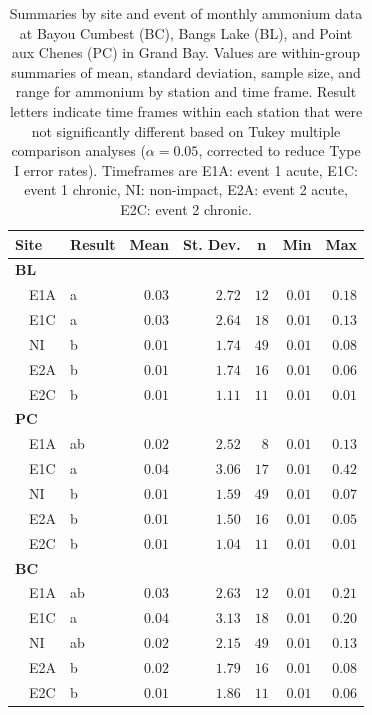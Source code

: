 \documentclass[letterpaper,12pt]{article}\usepackage[]{graphicx}\usepackage[]{color}
\begin{document}
\begin{table}[!tbp]
\caption{Summaries by site and event of monthly ammonium data at Bayou Cumbest (BC), Bangs Lake (BL), and Point aux Chenes (PC) in Grand Bay.  Values are within-group summaries of mean, standard deviation, sample size, and range for ammonium by station and time frame.  Result letters indicate time frames within each station that were not significantly different based on Tukey multiple comparison analyses ($\alpha = 0.05$, corrected to reduce Type I error rates). Timeframes are E1A: event 1 acute, E1C: event 1 chronic, NI: non-impact, E2A: event 2 acute, E2C: event 2 chronic.\label{tab:ammontab}} 
\begin{center}
\begin{tabular}{llrrrrr}
\hline\hline
\multicolumn{1}{l}{Site}&\multicolumn{1}{c}{Result}&\multicolumn{1}{c}{Mean}&\multicolumn{1}{c}{St. Dev.}&\multicolumn{1}{c}{n}&\multicolumn{1}{c}{Min}&\multicolumn{1}{c}{Max}\tabularnewline
\hline
{\bfseries BL}&&&&&&\tabularnewline
~~E1A&a&$0.03$&$2.72$&$12$&$0.01$&$0.18$\tabularnewline
~~E1C&a&$0.03$&$2.64$&$18$&$0.01$&$0.13$\tabularnewline
~~NI&b&$0.01$&$1.74$&$49$&$0.01$&$0.08$\tabularnewline
~~E2A&b&$0.01$&$1.74$&$16$&$0.01$&$0.06$\tabularnewline
~~E2C&b&$0.01$&$1.11$&$11$&$0.01$&$0.01$\tabularnewline
\hline
{\bfseries PC}&&&&&&\tabularnewline
~~E1A&ab&$0.02$&$2.52$&$ 8$&$0.01$&$0.13$\tabularnewline
~~E1C&a&$0.04$&$3.06$&$17$&$0.01$&$0.42$\tabularnewline
~~NI&b&$0.01$&$1.59$&$49$&$0.01$&$0.07$\tabularnewline
~~E2A&b&$0.01$&$1.50$&$16$&$0.01$&$0.05$\tabularnewline
~~E2C&b&$0.01$&$1.04$&$11$&$0.01$&$0.01$\tabularnewline
\hline
{\bfseries BC}&&&&&&\tabularnewline
~~E1A&ab&$0.03$&$2.63$&$12$&$0.01$&$0.21$\tabularnewline
~~E1C&a&$0.04$&$3.13$&$18$&$0.01$&$0.20$\tabularnewline
~~NI&ab&$0.02$&$2.15$&$49$&$0.01$&$0.13$\tabularnewline
~~E2A&b&$0.02$&$1.79$&$16$&$0.01$&$0.08$\tabularnewline
~~E2C&b&$0.01$&$1.86$&$11$&$0.01$&$0.06$\tabularnewline
\hline
\end{tabular}\end{center}

\end{table}

\clearpage
\end{document}
